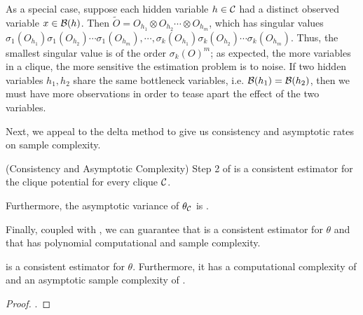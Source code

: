 As a special case, suppose each hidden variable $h \in \mathcal{C}$ had
  a distinct observed variable $x \in \mathcal{B}(h)$. 
Then $\tilde O = O_{h_1} \otimes O_{h_2} \cdots \otimes O_{h_m}$, which
  has singular values $\sigma_1(O_{h_1}) \sigma_1(O_{h_2}) \cdots
  \sigma_1(O_{h_m}), \cdots, \sigma_k(O_{h_1}) \sigma_k(O_{h_2}) \cdots
  \sigma_k(O_{h_m})$. 
Thus, the smallest singular value is of the order $\sigma_k(O)^m$; as
  expected, the more variables in a clique, the more sensitive the
  estimation problem is to noise.
If two hidden variables $h_1, h_2$ share the same bottleneck
  variables, i.e. $\mathcal{B}(h_1) = \mathcal{B}(h_2)$, then we must have more
  observations in order to tease apart the effect of the two
  variables\verify\reword.


Next, we appeal to the delta method to give us
  consistency and asymptotic rates on sample complexity.
\begin{corollary}(Consistency and Asymptotic Complexity)
  \label{cor:asymptotics}
  Step 2 of  is a consistent estimator for
  the clique potential for every clique $\mathcal{C}$.

  Furthermore, the asymptotic variance of $\theta_{\mathcal{C}}$ is
  .
\end{corollary}

Finally, coupled with , we can guarantee that
   is a consistent estimator for $\theta$ and 
  that has polynomial computational and sample complexity.
\begin{theorem}
   is a consistent estimator for $\theta$.
  Furthermore, it has a computational complexity of  and an
    asymptotic sample complexity of .
\end{theorem}
\begin{proof}
  .
\end{proof}
